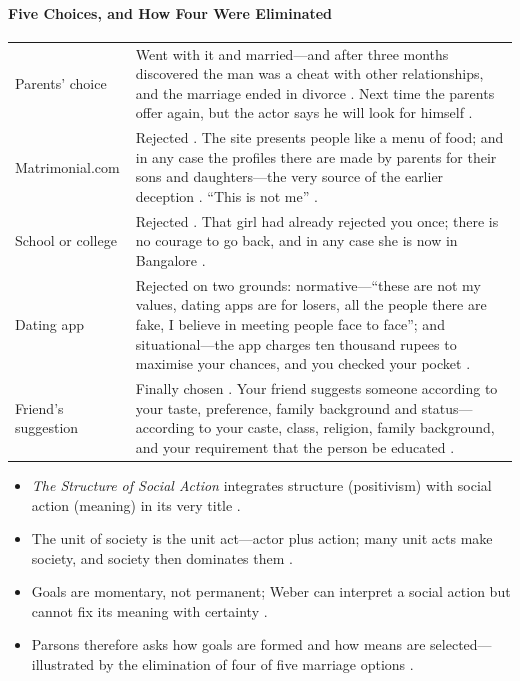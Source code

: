 \paragraph{Five Choices, and How Four Were Eliminated}
\vspace{6pt}
\noindent
\begin{tabularx}{\textwidth}{>{\hsize}Y >{\hsize}Y}
\toprule
{}
 &  \\
\midrule
Parents' choice & Went with it and married---and after three months discovered the man was a cheat with other relationships, and the marriage ended in divorce . Next time the parents offer again, but the actor says he will look for himself . \\
\midrule
Matrimonial.com & Rejected . The site presents people like a menu of food; and in any case the profiles there are made by parents for their sons and daughters---the very source of the earlier deception . ``This is not me'' . \\
\midrule
School or college & Rejected . That girl had already rejected you once; there is no courage to go back, and in any case she is now in Bangalore . \\
\midrule
Dating app & Rejected on two grounds: normative---``these are not my values, dating apps are for losers, all the people there are fake, I believe in meeting people face to face''; and situational---the app charges ten thousand rupees to maximise your chances, and you checked your pocket . \\
\midrule
Friend's suggestion & Finally chosen . Your friend suggests someone according to your taste, preference, family background and status---according to your caste, class, religion, family background, and your requirement that the person be educated . \\
\bottomrule
\end{tabularx}
\vspace{6pt}

\begin{QuickRevision}
\begin{itemize}
    \item \textit{The Structure of Social Action} integrates structure (positivism) with social action (meaning) in its very title .
    \item The unit of society is the unit act---actor plus action; many unit acts make society, and society then dominates them .
    \item Goals are momentary, not permanent; Weber can interpret a social action but cannot fix its meaning with certainty .
    \item Parsons therefore asks how goals are formed and how means are selected---illustrated by the elimination of four of five marriage options .
\end{itemize}
\end{QuickRevision}

